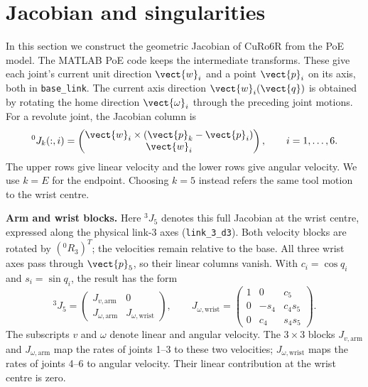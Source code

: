 \section{Jacobian and singularities}
\label{sec:jacobian}

In this section we construct the geometric Jacobian of CuRo6R from the PoE model.
The MATLAB PoE code keeps the intermediate transforms. These give each
joint's current unit direction $\vect{w}_i$ and a point $\vect{p}_i$ on its axis, both in
\texttt{base\_link}. The current axis direction $\vect{w}_i(\vect{q})$ is obtained by
rotating the home direction $\vect{\omega}_i$ through the preceding joint motions.
For a revolute joint, the Jacobian column is
\begin{equation}
 {}^0J_k(:,i)=
 \begin{pmatrix}\vect{w}_i\times(\vect{p}_k-\vect{p}_i)\\\vect{w}_i\end{pmatrix},
 \qquad i=1,\ldots,6.
 \label{eq:jacobian-column}
\end{equation}
The upper rows give linear velocity and the lower rows give angular
velocity. We use $k=E$ for the endpoint. Choosing $k=5$ instead refers the
same tool motion to the wrist centre.

\textbf{Arm and wrist blocks.}
Here ${}^3J_5$ denotes this full Jacobian at the wrist centre, expressed
along the physical link-3 axes (\texttt{link\_3\_d3}). Both velocity blocks are rotated by
$({}^0R_3)^T$; the velocities remain relative to the base.
All three wrist axes pass through $\vect{p}_5$, so their linear columns vanish.
With $c_i=\cos q_i$ and $s_i=\sin q_i$, the result has the form
\begin{equation}
 {}^3J_5=\begin{pmatrix}J_{v,\mathrm{arm}}&0\\J_{\omega,\mathrm{arm}}&J_{\omega,\mathrm{wrist}}\end{pmatrix},\qquad
 J_{\omega,\mathrm{wrist}}=\begin{pmatrix}
 1&0&c_5\\
 0&-s_4&c_4s_5\\
 0&c_4&s_4s_5
 \end{pmatrix}.
 \label{eq:jacobian-wrist}
\end{equation}
The subscripts $v$ and $\omega$ denote linear and angular velocity.
The $3\times3$ blocks $J_{v,\mathrm{arm}}$ and $J_{\omega,\mathrm{arm}}$
map the rates of joints 1--3 to these two velocities; $J_{\omega,\mathrm{wrist}}$
maps the rates of joints 4--6 to angular velocity. Their linear contribution
at the wrist centre is zero.

